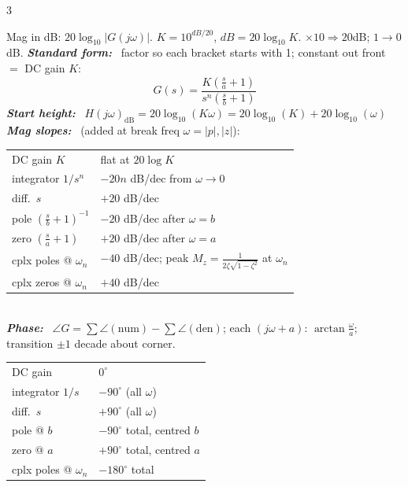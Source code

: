 \documentclass[9pt]{extarticle}
\newcommand{\sect}[1]{%
  \vspace{2pt}\par\noindent
  \colorbox{hdrbg}{\makebox[\dimexpr\linewidth-2\fboxsep][l]{%
    \textbf{\footnotesize\textcolor{hdr}{#1}}}}%
  \par\vspace{1.5pt}}
\newcommand{\sub}[1]{\textit{\textbf{#1:}}\ }
\begin{document}
\begin{multicols}{3}
\sect{13. Bode Plots (Lec 9--10)}
Mag in dB: $20\log_{10}|G(j\omega)|$. $K=10^{dB/20}$, $dB=20\log_{10}K$. $\times10\!\Rightarrow\!20$dB; $1\!\to\!0$dB.
\sub{Standard form} factor so each bracket starts with 1; constant out front $=$ DC gain $K$:
\[ G(s)=\frac{K(\tfrac sa{+}1)}{s^n(\tfrac sb{+}1)} \]
\sub{Start height} $H(j\omega)_{\mathrm{dB}}=20\log_{10}(K\omega)=20\log_{10}(K)+20\log_{10}(\omega)$\\
\sub{Mag slopes} (added at break freq $\omega{=}|p|,|z|$):\\
\begin{tabular}{@{}ll@{}}
\hline
DC gain $K$ & flat at $20\log K$\\
integrator $1/s^n$ & $-20n$ dB/dec from $\omega{\to}0$\\
diff.\ $s$ & $+20$ dB/dec\\
pole $(\tfrac sb{+}1)^{-1}$ & $-20$ dB/dec after $\omega{=}b$\\
zero $(\tfrac sa{+}1)$ & $+20$ dB/dec after $\omega{=}a$\\
cplx poles @ $\omega_n$ & $-40$ dB/dec; peak $M_z=\tfrac{1}{2\zeta\sqrt{1-\zeta^2}}$ at $\omega_n$\\
cplx zeros @ $\omega_n$ & $+40$ dB/dec\\
\hline
\end{tabular}\\
\sub{Phase} $\angle G=\sum\angle(\text{num}){-}\sum\angle(\text{den})$; each $(j\omega{+}a)$: $\arctan\tfrac\omega a$; transition $\pm1$ decade about corner.
\begin{tabular}{@{}ll@{}}
\hline
DC gain & $0^\circ$\\
integrator $1/s$ & $-90^\circ$ (all $\omega$)\\
diff.\ $s$ & $+90^\circ$ (all $\omega$)\\
pole @ $b$ & $-90^\circ$ total, centred $b$\\
zero @ $a$ & $+90^\circ$ total, centred $a$\\
cplx poles @ $\omega_n$ & $-180^\circ$ total\\
\hline
\end{tabular}\\

\end{multicols}
\end{document}
